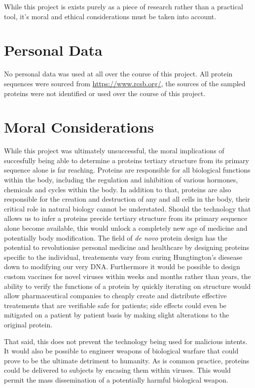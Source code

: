 While this project is exists purely as a piece
of research rather than a practical tool, it's 
moral and ethical considerations must be taken into
account.

\section{Personal Data}
No personal data was used at all over the course
of this project. All protein sequences were sourced
from \url{https://www.rcsb.org/}, the sources
of the sampled proteins were not identified
or used over the course of this project.

\section{Moral Considerations}
While this project was ultimately unsuccessful,
the moral implications of succesfully being
able to determine a proteins tertiary structure
from its primary sequence alone is far reaching.
Proteins are responsible for all biological
functions within the body, including
the regulation and inhibition of various
hormones, chemicals and cycles within the body.
In addition to that, proteins are also 
responsible for the creation and destruction
of any and all cells in the body, their
critical role in natural biology cannot be 
understated. Should the technology that allows
us to infer a proteins precide tertiary structure
from its primary sequence alone become available,
this would unlock a completely new age of medicine
and potentially body modification. The field
of \emph{de novo} protein design has the potential
to revolutionise personal medicine and healthcare
by designing proteins specific to the individual,
treatements vary from curing Hungtington's diesease
down to modifying our very DNA. Furthermore 
it would be possible to design custom vaccines
for novel viruses within weeks and months rather
than years, the ability to verify the functions
of a protein by quickly iterating on structure
would allow pharmaceutical companies to cheaply
create and distribute effective treatements
that are verifiable safe for patients; side
effects could even be mitigated on a patient
by patient basis by making slight alterations
to the original protein.

That said, this does not prevent the technology
being used for malicious intents. It would also
be possible to engineer weapons of biological 
warfare that could prove to be the ultimate
detriment to humanity. As is common practice,
proteins could be delivered to subjects by encasing
them within viruses. This would permit the mass
dissemination of a potentially harmful biological
weapon.


